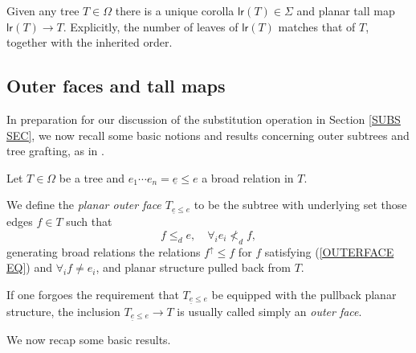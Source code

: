 \documentclass[a4paper,10pt]{article}%
\begin{document}
\begin{remark}\label{UNIQCOR REM}
	Given any tree $T \in \Omega$ there is a unique corolla $\mathsf{lr}(T) \in \Sigma$ and planar tall map 
	$\mathsf{lr}(T) \to T$.
	Explicitly, the number of leaves of $\mathsf{lr}(T)$ matches that of $T$, together with the inherited order. 
\end{remark}


\subsection{Outer faces and tall maps}\label{OUTTALL SEC}



In preparation for our discussion of the substitution operation in Section \ref{SUBS SEC}, we now recall some basic notions and results concerning outer subtrees and tree grafting, as in \cite[Section 5]{Pe17}.

\begin{definition}
	Let $T \in \Omega$ be a tree and 
	$e_1 \cdots e_n =\underline{e} \leq e$ a broad relation in $T$.
	
	We define the \textit{planar outer face $T_{\underline{e} \leq e}$}
	to be the subtree with underlying set those edges $f \in T$ such that
\begin{equation}\label{OUTERFACE EQ}
	f \leq_d e,\quad \forall_i e_i \nless_d f,
\end{equation}
generating broad relations the relations $f^{\uparrow} \leq f$ for $f$ satisfying (\ref{OUTERFACE EQ}) and $\forall_i f\neq e_i$,
and planar structure pulled back from $T$.
\end{definition}


\begin{remark}
If one forgoes the requirement that $T_{\underline{e} \leq e}$ be equipped with the pullback planar structure, the inclusion $T_{\underline{e} \leq e} \to T$ is usually called simply an \textit{outer face}.
\end{remark}

We now recap some basic results.
\end{document}
